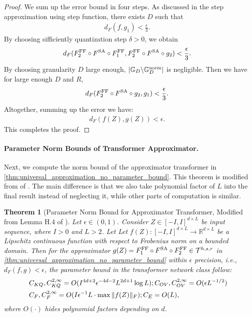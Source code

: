 \documentclass[12pt]{article}
\numberwithin{equation}{section}
\def\R{\mathbb{R}}
\let\cite\citep
\theoremstyle{theoremstyle}
\newtheorem{theorem}{Theorem}[section]
\numberwithin{equation}{section}
\numberwithin{theorem}{section}
\numberwithin{proposition}{section}
\numberwithin{definition}{section}
\numberwithin{lemma}{section}
\numberwithin{assumption}{section}
\numberwithin{remark}{section}
\begin{document}
\begin{proof}
We sum up the error bound in four steps.
As discussed in the step approximation using step function, there exists $D$ such that 
\begin{align*}
    d_F(f,g_1)<\frac{\epsilon}{3}.
\end{align*}
By choosing sifficiently quantization step $\delta>0$, we obtain
\begin{align*}
    d_F(F^{\rm FF}_2\circ F^{\rm SA}\circ F^{\rm FF}_1,F^{\rm FF}_2\circ F^{\rm SA}\circ g_2)<\frac{\epsilon}{3}.
\end{align*}
By choosing granularity $D$ large enough, $|\mathbb{G}_D\backslash\mathbb{G}_D^{\rm norm}|$ is negligible.
Then we have for large enough $D$ and $R$,
\begin{align*}
    d_F(F^{\rm FF}_2\circ F^{\rm SA}\circ g_2,g_1)<\frac{\epsilon}{3}.
\end{align*}
Altogether, summing up the error we have:
\begin{align*}
    d_F(f(Z),g(Z))<\epsilon.
\end{align*}
This completes the proof.
\end{proof}

\paragraph{Parameter Norm Bounds of  Transformer Approximator.}
Next, we compute the norm bound of the approximator transformer in \cref{thm:universal_approximation_no_parameter_bound}.
This theorem is modified from of \cite[Lemma H.4]{su2025high}.
The main difference is that we also take polynomial factor of $L$ into the final result instead of neglecting it, while other parts of computation is similar.
\begin{theorem}[Parameter Norm Bound for Approximator Transformer, Modified from Lemma H.4 of \cite{su2025high}]
\label{thm:parameter_norm_bound_for _approximator_transformer}
Let $\epsilon\in(0,1)$.
Consider $Z\in[-I,I]^{d\times L}$ be input sequence, where $I>0$ and $L>2$.
Let Let $f(Z):[-I,I]^{d\times L}\to \R^{d\times L}$ be a Lipschitz continuous function with respect to Frobenius norm on a bounded domain.
Then for the approximator $g(Z)=F^{\rm FF}_1\circ F^{\rm SA}\circ F^{\rm FF}_2\in\mathcal{T}^{h,s,r}$ in \cref{thm:universal_approximation_no_parameter_bound} within $\epsilon$ precision, i.e., $d_F(f,g)<\epsilon$, the parameter bound in the transformer network class follow:
\begin{align*}
    & ~C_{KQ},C^{2,\infty}_{KQ}=O(I^{4d+2}\epsilon^{-4d-2}L^{2d+1}\log L);C_{OV},C^{2,\infty}_{OV}=O(\epsilon L^{-1/2}) \notag\\
    & ~C_{F},C^{2,\infty}_{F}=O(I\epsilon^{-1}L\cdot\max\|f(Z)\|_F);C_E=O(L),
\end{align*}
where $O(\cdot)$ hides polynomial factors depending on $d$.
\end{theorem}
\end{document}
